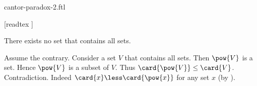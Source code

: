 \documentclass{stex}
\begin{document}
\begin{smodule}{cantor-paradox-2.ftl}
  \begin{forthel}
    [readtex ]
  \end{forthel}

  \begin{ftheorem*}[label=cantor_paradox_2,title=Cantor's Second Paradox]
    There exists no set that contains all sets.
  \end{ftheorem*}
  \begin{fproof}
    Assume the contrary.
    Consider a set $V$ that contains all sets.
    Then $\pow{V}$ is a set.
    Hence $\pow{V}$ is a subset of $V$.
    Thus $\card{\pow{V}} \leq \card{V}$.
    Contradiction.
    Indeed $\card{x} \less \card{\pow{x}}$ for any set $x$ (by ).
  \end{fproof}
\end{smodule}
\end{document}
